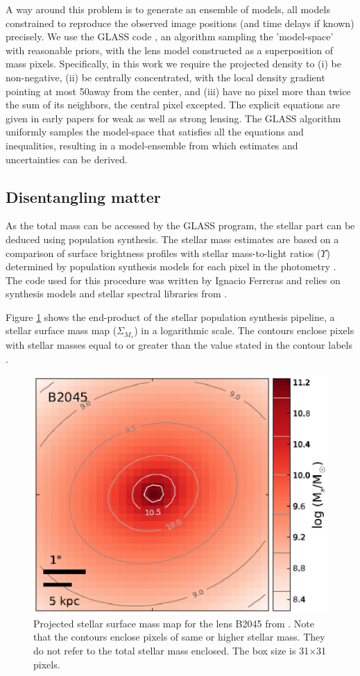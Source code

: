 \documentclass[useAMS,usenatbib]{mn2e}
\begin{document}
A way around this problem is to generate an ensemble of models, all models constrained to reproduce the observed image positions (and time delays if known) precisely. We use the GLASS code \citep{JC}, an algorithm sampling the 'model-space' with reasonable priors, with the lens model constructed as a superposition of mass pixels. Specifically, in this work we require the projected density to (i) be non-negative, (ii) be centrally concentrated, with the local density gradient pointing at most 50\degr  away from the center, and (iii) have no pixel more than twice the sum of its neighbors, the central pixel excepted. The explicit equations are given in early papers \citep{SW, Ab} for weak as well as strong lensing. The GLASS algorithm uniformly samples the model-space that satisfies all the equations and inequalities, resulting in a model-ensemble from which estimates and uncertainties can be derived.

\subsection{Disentangling matter}

As the total mass can be accessed by the GLASS program, the stellar part can be deduced using population synthesis. The stellar mass estimates are based on a comparison of surface brightness profiles with stellar mass-to-light ratios ($\Upsilon$) determined by population synthesis models for each pixel in the photometry \citep{IF,IF2}. The code used for this procedure was written by Ignacio Ferreras and relies on synthesis models and stellar spectral libraries from \citep{Bru}.

Figure \ref{f1} shows the end-product of the stellar population synthesis pipeline, a stellar surface mass map ($\Sigma _{M_s}$) in a logarithmic scale. The contours enclose pixels with stellar masses equal to or greater than the value stated in the contour labels \citep{DL}. 

\begin{figure}
\begin{center}
\hspace{-7mm}\includegraphics[height=0.29\textwidth]{f1.eps}
\caption{Projected stellar surface mass map for the lens B2045 from \citet{DL}. Note that the contours enclose pixels of same or higher stellar mass. They do not refer to the total stellar mass enclosed. The box size is 31$\times$31 pixels.}
\label{f1}
\end{center}
\end{figure}
 
\end{document}

